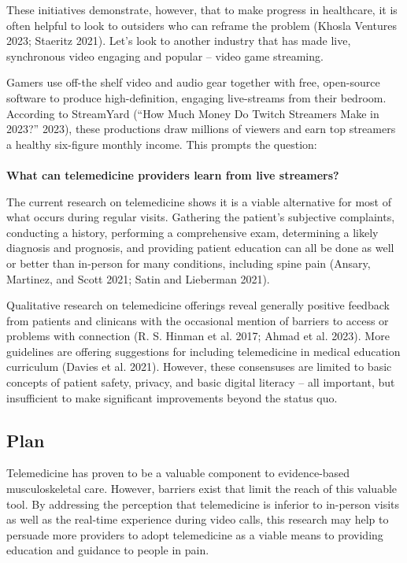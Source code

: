\documentclass[
  letterpaper,
]{article}
\makeatletter
\let\oldparagraph\paragraph
\renewcommand{\paragraph}{
    \@ifstar
      \xxxParagraphStar
      \xxxParagraphNoStar
  }
\newcommand{\xxxParagraphStar}[1]{\oldparagraph*{#1}\mbox{}}
\newcommand{\xxxParagraphNoStar}[1]{\oldparagraph{#1}\mbox{}}
\makeatother
\begin{document}
These initiatives demonstrate, however, that to make progress in
healthcare, it is often helpful to look to outsiders who can reframe the
problem (Khosla Ventures 2023; Staeritz 2021). Let's look to another
industry that has made live, synchronous video engaging and popular --
video game streaming.

Gamers use off-the shelf video and audio gear together with free,
open-source software to produce high-definition, engaging live-streams
from their bedroom. According to StreamYard ({``How {Much Money Do
Twitch Streamers Make} in 2023?''} 2023), these productions draw
millions of viewers and earn top streamers a healthy six-figure monthly
income. This prompts the question:

\paragraph{\texorpdfstring{\textbf{What can telemedicine providers learn
from live
streamers?}}{What can telemedicine providers learn from live streamers?}}\label{what-can-telemedicine-providers-learn-from-live-streamers}

The current research on telemedicine shows it is a viable alternative
for most of what occurs during regular visits. Gathering the patient's
subjective complaints, conducting a history, performing a comprehensive
exam, determining a likely diagnosis and prognosis, and providing
patient education can all be done as well or better than in-person for
many conditions, including spine pain (Ansary, Martinez, and Scott 2021;
Satin and Lieberman 2021).

Qualitative research on telemedicine offerings reveal generally positive
feedback from patients and clinicans with the occasional mention of
barriers to access or problems with connection (R. S. Hinman et al.
2017; Ahmad et al. 2023). More guidelines are offering suggestions for
including telemedicine in medical education curriculum (Davies et al.
2021). However, these consensuses are limited to basic concepts of
patient safety, privacy, and basic digital literacy -- all important,
but insufficient to make significant improvements beyond the status quo.

\subsection{Plan}\label{plan}

Telemedicine has proven to be a valuable component to evidence-based
musculoskeletal care. However, barriers exist that limit the reach of
this valuable tool. By addressing the perception that telemedicine is
inferior to in-person visits as well as the real-time experience during
video calls, this research may help to persuade more providers to adopt
telemedicine as a viable means to providing education and guidance to
people in pain.
\end{document}
